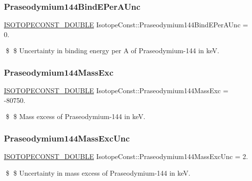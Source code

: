 \subsubsection{\texorpdfstring{Praseodymium144\+Bind\+E\+Per\+A\+Unc}{Praseodymium144BindEPerAUnc}}
{\footnotesize\ttfamily \mbox{\hyperlink{group___isotope_const-_macros_ga8f45a7272ce02c0b4c65c44636ed719a}{I\+S\+O\+T\+O\+P\+E\+C\+O\+N\+S\+T\+\_\+\+D\+O\+U\+B\+LE}} Isotope\+Const\+::\+Praseodymium144\+Bind\+E\+Per\+A\+Unc = 0.}

\$ \$ Uncertainty in binding energy per A of Praseodymium-\/144 in keV. \mbox{\label{group___isotope_const-_praseodymium-_pr144_ga8350769fbf9ff0af71de18d80c31a619}} 
\subsubsection{\texorpdfstring{Praseodymium144\+Mass\+Exc}{Praseodymium144MassExc}}
{\footnotesize\ttfamily \mbox{\hyperlink{group___isotope_const-_macros_ga8f45a7272ce02c0b4c65c44636ed719a}{I\+S\+O\+T\+O\+P\+E\+C\+O\+N\+S\+T\+\_\+\+D\+O\+U\+B\+LE}} Isotope\+Const\+::\+Praseodymium144\+Mass\+Exc = -\/80750.}

\$ \$ Mass excess of Praseodymium-\/144 in keV. \mbox{\label{group___isotope_const-_praseodymium-_pr144_ga58986b6a2c0d650c6aa2df55ce295ff9}} 
\subsubsection{\texorpdfstring{Praseodymium144\+Mass\+Exc\+Unc}{Praseodymium144MassExcUnc}}
{\footnotesize\ttfamily \mbox{\hyperlink{group___isotope_const-_macros_ga8f45a7272ce02c0b4c65c44636ed719a}{I\+S\+O\+T\+O\+P\+E\+C\+O\+N\+S\+T\+\_\+\+D\+O\+U\+B\+LE}} Isotope\+Const\+::\+Praseodymium144\+Mass\+Exc\+Unc = 2.}

\$ \$ Uncertainty in mass excess of Praseodymium-\/144 in keV. \mbox{\label{group___isotope_const-_praseodymium-_pr144_ga356aa60580b723d73c76f2e5253979c6}} 
